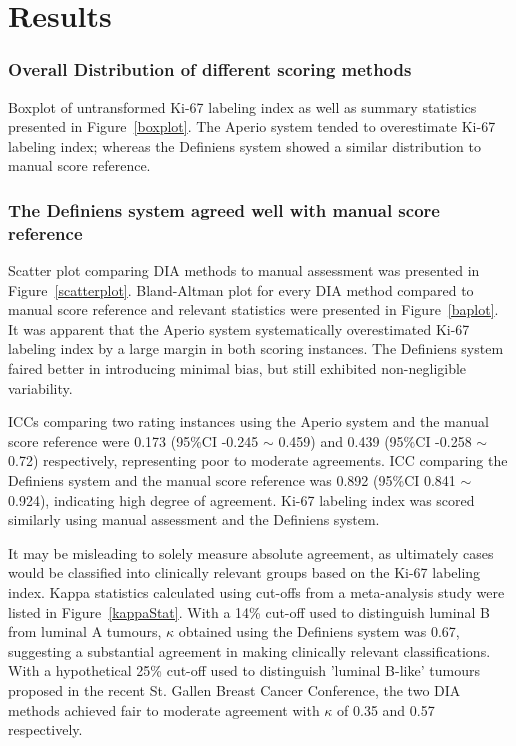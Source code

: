 \documentclass[final,5p,times,twocolumn]{elsarticle}
\begin{document}
\section*{Results}

\subsubsection*{Overall Distribution of different scoring methods}
Boxplot of untransformed Ki-67 labeling index as well as summary statistics presented in Figure~\ref{boxplot}. The Aperio system tended to overestimate Ki-67 labeling index; whereas the Definiens system showed a similar distribution to manual score reference.

\subsubsection*{The Definiens system agreed well with manual score reference}

 Scatter plot comparing DIA methods to manual assessment was presented in Figure~\ref{scatterplot}. Bland-Altman plot for every DIA method compared to manual score reference and relevant statistics were presented in Figure~\ref{baplot}. It was apparent that the Aperio system systematically overestimated Ki-67 labeling index by a large margin in both scoring instances. The Definiens system faired better in introducing minimal bias, but still exhibited non-negligible variability.

ICCs comparing two rating instances using the Aperio system and the manual score reference were 0.173 (95\%CI -0.245 $\sim$ 0.459) and 0.439 (95\%CI -0.258 $\sim$  0.72) respectively, representing poor to moderate agreements. ICC comparing the Definiens system and the manual score reference was 0.892 (95\%CI 0.841 $\sim$ 0.924), indicating high degree of agreement. Ki-67 labeling index was scored similarly using manual assessment and the Definiens system.

It may be misleading to solely measure absolute agreement, as ultimately cases would be classified into clinically relevant groups based on the Ki-67 labeling index. Kappa statistics calculated using cut-offs from a meta-analysis study were listed in Figure~\ref{kappaStat}. \cite{Petrelli2015} With a 14\% cut-off used to distinguish luminal B from luminal A tumours, \cite{Cheang2009} $\kappa$ obtained using the Definiens system was 0.67, suggesting a substantial agreement in making clinically relevant classifications. \cite{Landis1977} With a hypothetical 25\% cut-off used to distinguish {'}luminal B-like{'} tumours proposed in the recent St. Gallen Breast Cancer Conference, \cite{Coates2015} the two DIA methods achieved fair to moderate agreement with $\kappa$ of 0.35 and 0.57 respectively.
\end{document}
